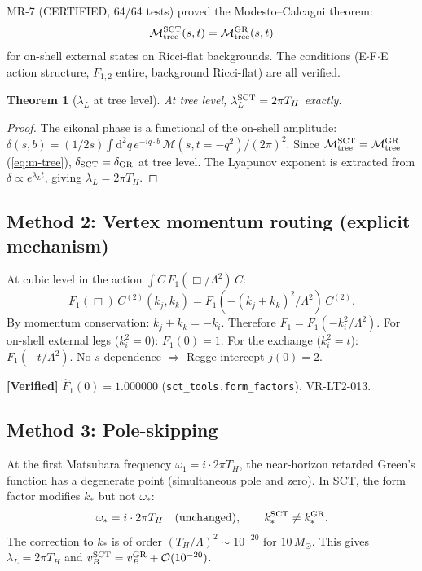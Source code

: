 \documentclass[11pt,a4paper]{article}
\renewcommand{\dd}{\mathrm{d}}
\renewcommand{\order}{\mathcal{O}}
\theoremstyle{plain}
\newtheorem{theorem}{Theorem}[section]
\theoremstyle{definition}
\newcommand{\verified}[1]{%
  \par\smallskip\noindent
  \colorbox{green!10}{\parbox{\dimexpr\linewidth-2\fboxsep}{%
    \textcolor{green!50!black}{\textbf{[Verified]}} #1}}%
  \par\smallskip}
\begin{document}
MR-7 (CERTIFIED, 64/64 tests) proved the Modesto--Calcagni theorem:
\begin{equation}
\label{eq:m-tree}
\mathcal{M}_{\rm tree}^{\rm SCT}(s,t)
= \mathcal{M}_{\rm tree}^{\rm GR}(s,t)
\end{equation}
for on-shell external states on Ricci-flat backgrounds.  The conditions
(E$\cdot$F$\cdot$E action structure, $F_{1,2}$ entire, background
Ricci-flat) are all verified.

\begin{theorem}[$\lambda_L$ at tree level]
\label{thm:lyapunov}
At tree level, $\lambda_L^{\rm SCT} = 2\pi T_H$ exactly.
\end{theorem}

\begin{proof}
The eikonal phase is a functional of the on-shell amplitude:
$\delta(s,b) = (1/2s)\int \dd^2 q\, e^{-iq\cdot b}\,
\mathcal{M}(s,t{=}{-}q^2)/(2\pi)^2$.
Since $\mathcal{M}_{\rm tree}^{\rm SCT} = \mathcal{M}_{\rm tree}^{\rm GR}$
(\cref{eq:m-tree}), $\delta_{\rm SCT} = \delta_{\rm GR}$ at tree level.
The Lyapunov exponent is extracted from $\delta \propto e^{\lambda_L t}$,
giving $\lambda_L = 2\pi T_H$.
\end{proof}

\subsection{Method 2: Vertex momentum routing (explicit mechanism)}

At cubic level in the action $\int C\,F_1(\Box/\Lambda^2)\,C$:
\begin{equation}
F_1(\Box)\,C^{(2)}(k_j,k_k) = F_1(-(k_j{+}k_k)^2/\Lambda^2)\,C^{(2)}.
\end{equation}
By momentum conservation: $k_j + k_k = -k_i$.  Therefore
$F_1 = F_1(-k_i^2/\Lambda^2)$.  For on-shell external legs ($k_i^2=0$):
$F_1(0) = 1$.  For the exchange ($k_i^2 = t$): $F_1(-t/\Lambda^2)$.
No $s$-dependence $\Rightarrow$ Regge intercept $j(0) = 2$.

\verified{$\hat{F}_1(0) = 1.000000$ (\texttt{sct\_tools.form\_factors}).
  VR-LT2-013.}

\subsection{Method 3: Pole-skipping}

At the first Matsubara frequency $\omega_1 = i\cdot 2\pi T_H$, the
near-horizon retarded Green's function has a degenerate point
(simultaneous pole and zero).  In SCT, the form factor modifies
$k_*$ but not $\omega_*$:
\begin{equation}
\omega_* = i\cdot 2\pi T_H \quad\text{(unchanged)}, \qquad
k_*^{\rm SCT} \neq k_*^{\rm GR}.
\end{equation}
The correction to $k_*$ is of order $(T_H/\Lambda)^2 \sim 10^{-20}$
for $10\,M_\odot$.  This gives $\lambda_L = 2\pi T_H$ and
$v_B^{\rm SCT} = v_B^{\rm GR} + \order(10^{-20})$.
\end{document}
